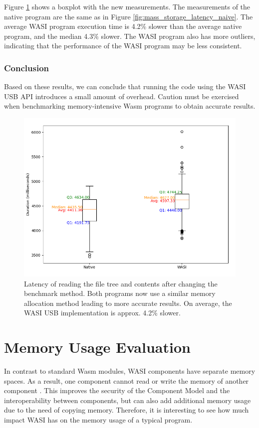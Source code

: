 Figure \ref{fig:mass_storage_latency_optimized} shows a boxplot with the new measurements. The measurements of the native program are the same as in Figure \ref{fig:mass_storage_latency_naive}. The average \acrshort{WASI} program execution time is 4.2\% slower than the average native program, and the median 4.3\% slower. The \acrshort{WASI} program also has more outliers, indicating that the performance of the \acrshort{WASI} program may be less consistent.

\subsubsection{Conclusion}
Based on these results, we can conclude that running the code using the \acrshort{WASI} \acrshort{USB} \acrshort{API} introduces a small amount of overhead. Caution must be exercised when benchmarking memory-intensive \acrshort{Wasm} programs to obtain accurate results.

\begin{figure}[H]
  \centering
  \includegraphics[width=1\textwidth]{images/mass_storage_1000_runs_optimized.png}
  \caption{Latency of reading the file tree and contents after changing the benchmark method. Both programs now use a similar memory allocation method leading to more accurate results. On average, the \acrshort{WASI} \acrshort{USB} implementation is approx. 4.2\% slower.}
  \label{fig:mass_storage_latency_optimized}
\end{figure}

\section{Memory Usage Evaluation}
In contrast to standard \acrshort{Wasm} modules, \acrshort{WASI} components have separate memory spaces. As a result, one component cannot read or write the memory of another component \cite{memory_model}. This improves the security of the Component Model and the interoperability between components, but can also add additional memory usage due to the need of copying memory. Therefore, it is interesting to see how much impact \acrshort{WASI} has on the memory usage of a typical program.

